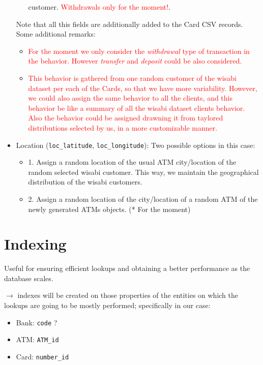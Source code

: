 \documentclass{article}
\begin{document}
\begin{itemize}
\begin{itemize}
        customer. \textcolor{red}{Withdrawals only for the moment!}.
    \end{itemize}
    Note that all this fields are additionally added to the Card CSV records.
    Some additional remarks:
    \begin{itemize}
        \item \textcolor{red}{For the moment we only consider the \textit{withdrawal} type of transaction in the behavior. However \textit{transfer} and \textit{deposit} could be also considered.}
        \item \textcolor{red}{This behavior is gathered from one random customer of the wisabi dataset per each of the Cards, so that we have more variability. However, we could also assign the same behavior to all the clients, and this behavior be like a summary of all the wisabi dataset clients behavior. Also the behavior could be assigned drawning it from taylored distributions selected by us, in a more customizable manner.}   
    \end{itemize}
    \item Location (\texttt{loc\_latitude}, \texttt{loc\_longitude}): Two possible options in this case:
    \begin{itemize}
        \item 1. Assign a random location of the usual ATM city/location of the random selected wisabi customer. This way, we maintain the geographical distribution of the wisabi customers.
        \item 2. Assign a random location of the city/location of a random ATM of the newly generated ATMs objects. (* For the moment)
    \end{itemize}
\end{itemize}

\section{Indexing}

Useful for ensuring efficient lookups and obtaining a better performance as the database 
scales.

$\rightarrow$ indexes will be created on those properties of the entities on which the 
lookups are going to be mostly performed; specifically in our case:
\begin{itemize}
  \item Bank: \texttt{code} ?
  \item ATM: \texttt{ATM\_id}
  \item Card: \texttt{number\_id}
\end{itemize}
\end{document}
